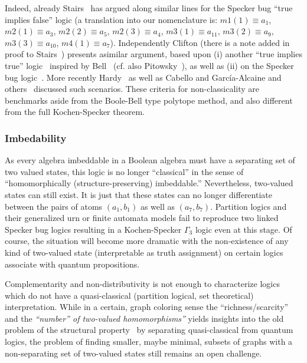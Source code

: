 \documentclass[%
  twocolumn,
 showpacs,
 showkeys,
 preprintnumbers,
 amsmath,amssymb,
 aps,
  pra,
  longbibliography,
 floatfix,
 ]{revtex4-1}
\begin{document}
Indeed, already Stairs~\cite[p.~588-589]{stairs83} has argued along similar lines for the Specker bug
``true implies false'' logic (a translation into our nomenclature
is:
$m1(1) \equiv a_1$,
$m2(1) \equiv a_3$,
$m2(2) \equiv a_5$,
$m2(3) \equiv a_4$,
$m3(1) \equiv a_{11}$,
$m3(2) \equiv a_9$,
$m3(3) \equiv a_{10}$,
$m4(1) \equiv a_7$).
Independently Clifton (there is a note added in proof to Stairs~\cite[p.~588-589]{stairs83})
presents asimilar argument, based upon (i) another ``true implies true'' logic~\cite[Sects.~II,III, Fig.~1]{clifton-93,Johansen-1994,Vermaas-1994}
inspired by Bell~\cite[Fig.~C.l. p.~67]{Belinfante-73} (cf. also Pitowsky~\cite[p.~394]{Pitowsky-1982-subs}),
as well as (ii) on the Specker bug logic~\cite[Sects.~IV, Fig.~2]{clifton-93}.
More recently Hardy~\cite{Hardy-92,Hardy-93,hardy-97}
as well as Cabello and
Garc{\'{i}}a-Alcaine and
others~\cite{Cabello-1995-ppks,cabello-96,cabello-97-nhvp,Badziag-2011,Cabello-2013-HP,Cabello-2013-Hardylike} discussed such scenarios.
These criteria for non-classicality are benchmarks aside from the Boole-Bell type polytope method,
and also different from the full Kochen-Specker theorem.


\subsubsection{Imbedability}

As every algebra imbeddable in a Boolean algebra must have a separating set of two valued states,
this logic is no longer ``classical''
in the sense of ``homomorphically (structure-preserving) imbeddable.''
Nevertheless, two-valued states can still exist. It is just that these states can no longer differentiate
between the pairs of atoms $(a_1,b_1)$ as well as $(a_7,b_7)$.
Partition logics and their generalized urn or finite automata models fail to reproduce
two linked Specker bug logics resulting in a Kochen-Specker $\Gamma_3$ logic even at this stage.
Of course, the situation will become more dramatic with the non-existence of any kind of two-valued state
(interpretable as truth assignment) on certain logics associate with quantum propositions.

Complementarity and non-distributivity is not enough to characterize logics which do not have a quasi-classical
(partition logical, set theoretical) interpretation.
While in a certain, graph coloring sense the ``richness/scarcity'' and the {\em ``number''
of two-valued homomorphisms''} yields insights into the old problem of the structural property~\cite{Cooke-1983}
by
separating quasi-classical from quantum logics,
the problem of finding smaller, maybe minimal,
subsets of graphs with a non-separating set of two-valued states  still remains an open challenge.
\end{document}
